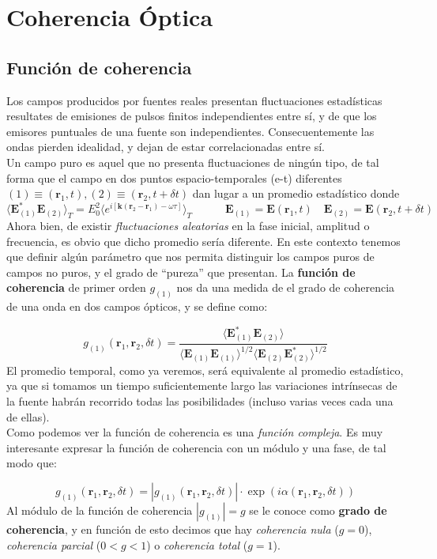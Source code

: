 \documentclass[12pt,a4paper]{book}
\numberwithin{equation}{section}
\numberwithin{figure}{section}
\newcommand{\tquad}{\quad \quad \quad}
\newcommand{\parentesis}[1]{\left( #1  \right)}
\newcommand{\1}{_{(1)}}
\newcommand{\2}{_{(2)}}
\newcommand{\rn}{\mathbf{r}}
\newcommand{\kn}{\mathbf{k}}
\newcommand{\En}{\mathbf{E}}
\theoremstyle{definition}
\begin{document}
\section{Coherencia Óptica}

\subsection{Función de coherencia}

Los campos producidos por fuentes reales presentan fluctuaciones estadísticas resultates de emisiones de pulsos finitos independientes entre sí, y de que los emisores puntuales de una fuente son independientes. Consecuentemente las ondas pierden idealidad, y dejan de estar correlacionadas entre sí. \\

Un campo puro es aquel que no presenta fluctuaciones de ningún tipo, de tal forma que el campo en dos puntos espacio-temporales (e-t) diferentes $(1)\equiv (\rn_1,t), (2)\equiv (\rn_2,t+\delta t)$ dan lugar a un promedio estadístico donde $$\langle \En_{(1)}^* \En_{(2)} \rangle_T = E_0^2 \langle  e^{i [\kn(\rn_2-\rn_1)-\omega \tau]} \rangle_T \tquad \En_{(1)}=\En (\rn_1,t) \quad \En_{(2)} = \En (\rn_2,t+\delta t)  $$ Ahora bien, de existir \textit{fluctuaciones aleatorias} en la fase inicial, amplitud o frecuencia, es obvio que dicho promedio sería diferente. En este contexto tenemos que definir algún parámetro que nos permita distinguir los campos puros de campos no puros, y el grado de ``pureza'' que presentan. La \textbf{función de coherencia} de primer orden $g_{(1)}$ nos da una medida de el grado de coherencia de una onda en dos campos ópticos, y se define como:

\begin{equation}
g_{(1)} (\rn_1,\rn_2,\delta t) = \frac{\langle \En_{(1)}^* \En\2 \rangle}{\langle \En\1\En\1 \rangle^{1/2}  \langle \En\2 \En\2^* \rangle^{1/2}} \label{Ec:02.04-1}
\end{equation} 
El promedio temporal, como ya veremos, será equivalente al promedio estadístico, ya que si tomamos un tiempo suficientemente largo las variaciones intrínsecas de la fuente habrán recorrido todas las posibilidades (incluso varias veces cada una de ellas). \\

Como podemos ver la función de coherencia es una \textit{función compleja}. Es muy interesante expresar la función de coherencia con un módulo y una fase, de tal modo que:

\begin{equation}
g_{(1)} (\rn_1,\rn_2,\delta t) = |g\1 (\rn_1,\rn_2,\delta t) | \cdot \exp  \parentesis{ i \alpha (\rn_1,\rn_2,\delta t)}
\end{equation}
Al módulo de la función de coherencia $|g\1|=g$ se le conoce como \textbf{grado de coherencia}, y en función de esto decimos que hay \textit{coherencia nula} ($g=0$), \textit{coherencia parcial} ($0 < g < 1$) o \textit{coherencia total} ($g=1$). \\
\end{document}

